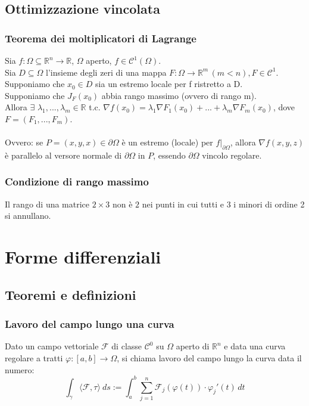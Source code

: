 \documentclass{article} %
\begin{document}
    \subsection*{Ottimizzazione vincolata}
    \subsubsection*{Teorema dei moltiplicatori di Lagrange}
    Sia $f:\Omega \subseteq \mathbb{R} ^n \to \mathbb{R}$, $\Omega$ aperto, $f \in \mathcal{C} ^1 (\Omega)$. \\ Sia $D \subseteq \Omega$ l'insieme degli zeri di una mappa $F: \Omega \to \mathbb{R} ^m \, (m<n), F \in \mathcal{C} ^1$. \\ Supponiamo che $x_0 \in D$ sia un estremo locale per f ristretto a D. \\ Supponiamo che $J_F(x_0)$ abbia rango massimo (ovvero di rango m). \\
    Allora $\exists$ $\lambda_1,...,\lambda_m \in \mathbb{R}$ t.c. $\nabla f(x_0) = \lambda_1 \nabla F_1(x_0) + ... + \lambda_m \nabla F_m(x_0)$, dove $F=(F_1, ... , F_m)$. \\ \\ 
    Ovvero: se $P=(x,y,x) \in \partial \Omega$ è un estremo (locale) per $f|_{\partial \Omega}$, allora $ \nabla f(x,y,z)$ è parallelo al versore normale di $\partial \Omega$ in $P$, essendo $\partial \Omega$ vincolo regolare. 

    \subsubsection*{Condizione di rango massimo}
    Il rango di una matrice $2 \times 3$ non è $2$ nei punti in cui tutti e 3 i minori di ordine 2 si annullano.
    

    \section{Forme differenziali}
    \subsection{Teoremi e definizioni}
    \subsubsection*{Lavoro del campo lungo una curva}
    Dato un campo vettoriale $\mathcal{F} $ di classe $ \mathcal{C} ^0 $ su $\Omega$ aperto di $ \mathbb{R} ^n $
    e data una curva regolare a tratti $\varphi:[a,b]\to \Omega $, si chiama lavoro del campo lungo la curva data il numero:
    $$ \int _\gamma \langle \mathcal{F} , \tau \rangle \  ds := \int_{a}^{b} \sum_{j = 1}^{n}  \mathcal{F}_j(\varphi (t)) \cdot \varphi_j ' (t) \,dt  $$
\end{document}
